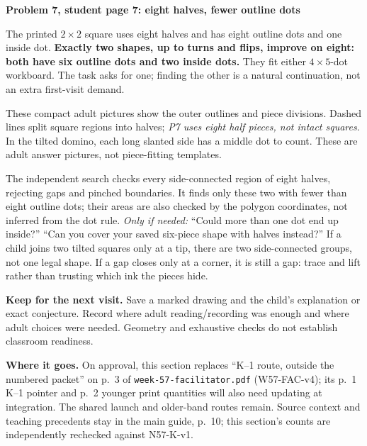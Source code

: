 \documentclass[11pt]{article}
\newcommand{\sub}[1]{\par\textbf{#1}\par}
\newcommand{\hint}[1]{\textit{Only if needed:} #1}
\newcommand{\dotgrid}[2]{\foreach \x in {0,...,#1}{\foreach \y in {0,...,#2}{\fill (\x,\y) circle (1.25pt);}}}
\begin{document}
\sub{Problem 7, student page 7: eight halves, fewer outline dots}
The printed $2\times2$ square uses eight halves and has eight outline dots and one inside dot. \textbf{Exactly two shapes, up to turns and flips, improve on eight: both have six outline dots and two inside dots.} They fit either $4\times5$-dot workboard. The task asks for one; finding the other is a natural continuation, not an extra first-visit demand.
\begin{center}
\end{center}
These compact adult pictures show the outer outlines and piece divisions. Dashed lines split square regions into halves; \emph{P7 uses eight half pieces, not intact squares}. In the tilted domino, each long slanted side has a middle dot to count. These are adult answer pictures, not piece-fitting templates.

The independent search checks every side-connected region of eight halves, rejecting gaps and pinched boundaries. It finds only these two with fewer than eight outline dots; their areas are also checked by the polygon coordinates, not inferred from the dot rule. \hint{``Could more than one dot end up inside?'' ``Can you cover your saved six-piece shape with halves instead?''} If a child joins two tilted squares only at a tip, there are two side-connected groups, not one legal shape. If a gap closes only at a corner, it is still a gap: trace and lift rather than trusting which ink the pieces hide.

\textbf{Keep for the next visit.} Save a marked drawing and the child's explanation or exact conjecture. Record where adult reading/recording was enough and where adult choices were needed. Geometry and exhaustive checks do not establish classroom readiness.

\textbf{Where it goes.} On approval, this section replaces ``K--1 route, outside the numbered packet'' on p.~3 of \texttt{week-57-facilitator.pdf} (W57-FAC-v4); its p.~1 K--1 pointer and p.~2 younger print quantities will also need updating at integration. The shared launch and older-band routes remain. Source context and teaching precedents stay in the main guide, p.~10; this section's counts are independently rechecked against N57-K-v1.
\end{document}
